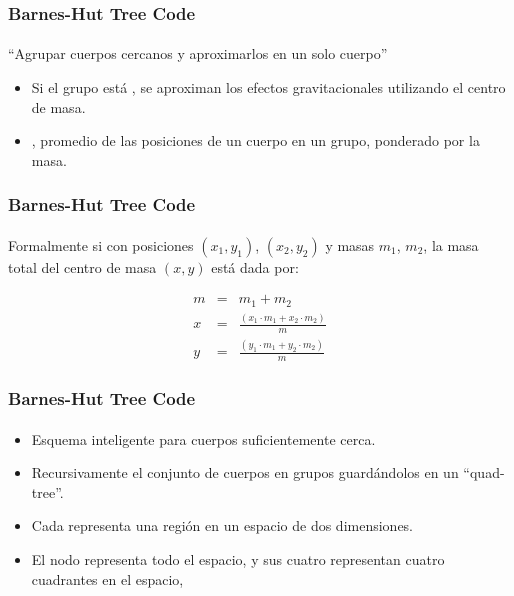 \frame
{
\frametitle{Barnes-Hut Tree Code}
\framesubtitle{}

\begin{center}
``Agrupar cuerpos cercanos y aproximarlos en un solo cuerpo''
\end{center}

\begin{itemize}
	\item Si el grupo está , se aproximan los efectos gravitacionales
		 utilizando el centro de masa.
	\item {}, promedio de las posiciones de un cuerpo en un grupo,
		 ponderado por la masa.
\end{itemize}
}

\frame
{
\frametitle{Barnes-Hut Tree Code}
\framesubtitle{}


\begin{center}
Formalmente si  con posiciones $(x_{1},y_{1})$, $(x_{2},y_{2})$ y
masas $m_{1}$, $m_{2}$, la masa total del centro de masa $(x,y)$ está dada por:
\end{center}

\begin{eqnarray}
	m &=& m_{1} + m_{2} \nonumber \\
	x &=& \frac{(x_{1}\cdot m_{1} + x_{2}\cdot m_{2})}{m} \nonumber \\
	y &=& \frac{(y_{1}\cdot m_{1} + y_{2}\cdot m_{2})}{m} \nonumber 
\end{eqnarray}

}

\frame
{
\frametitle{Barnes-Hut Tree Code}
\framesubtitle{}

\begin{itemize}
	\item Esquema inteligente para  cuerpos suficientemente cerca.
	\item Recursivamente  el conjunto de cuerpos en grupos
		guardándolos en un ``quad-tree''.
	\item Cada  representa una región en un espacio de dos dimensiones.
	\item El nodo  representa todo el espacio,
		y sus cuatro  representan cuatro cuadrantes en el espacio,
\end{itemize}
}

